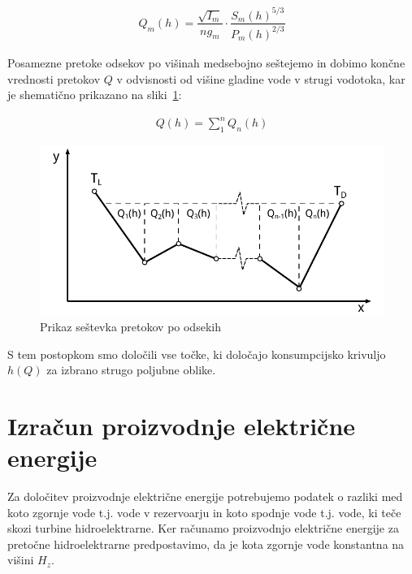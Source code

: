 \begin{ceqn}
	\begin{align}
	Q_m(h) = \dfrac{\sqrt{I_m}}{ng_m} \cdot \dfrac{S_m(h)^{5/3}}{P_m(h)^{2/3}}
	\end{align}
\end{ceqn}


Posamezne pretoke odsekov po višinah medsebojno seštejemo in dobimo končne vrednosti pretokov $Q$ v odvisnosti od višine gladine vode v strugi vodotoka, kar je shematično prikazano na sliki~\ref{fig:customChannel_sestevek}:

\begin{ceqn}
	\begin{align}
	Q(h) = \sum_{1}^{n} Q_n(h)
	\end{align}
\end{ceqn}


\begin{figure}[ht!]
	\begin{centering}
		\includegraphics{slike/customChannel/sestevekPretokov.pdf}
		\caption{Prikaz seštevka pretokov po odsekih}\label{fig:customChannel_sestevek}
	\end{centering}
\end{figure}



S tem postopkom smo določili vse točke, ki določajo konsumpcijsko krivuljo $h(Q)$ za izbrano strugo poljubne oblike.


\newpage

\section{Izračun proizvodnje električne energije}
Za določitev proizvodnje električne energije potrebujemo podatek o razliki med koto zgornje vode t.j. vode v rezervoarju in koto spodnje vode t.j. vode, ki teče skozi turbine hidroelektrarne. Ker računamo proizvodnjo električne energije za pretočne hidroelektrarne predpostavimo, da je kota zgornje vode konstantna na višini $H_z$.


